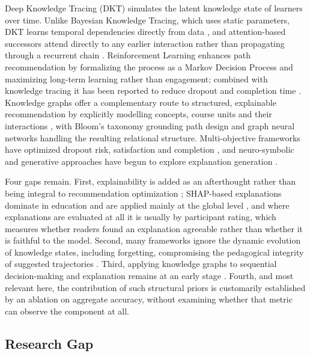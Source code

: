 Deep Knowledge Tracing (DKT) \cite{piech2015dkt} simulates the latent knowledge state of
learners over time. Unlike Bayesian Knowledge Tracing, which uses static parameters, DKT
learns temporal dependencies directly from data \cite{zhang2017dkvmn}, and attention-based
successors \cite{pandey2019sakt, ghosh2020akt} attend directly to any earlier interaction
rather than propagating through a recurrent chain \cite{vaswani2017attention}.
Reinforcement Learning enhances path recommendation by formalizing the process as a Markov
Decision Process and maximizing long-term learning rather than engagement; combined with
knowledge tracing it has been reported to reduce dropout and completion time
\cite{shen2021lpkt, zhao2026rlkt}. Knowledge graphs offer a complementary route to
structured, explainable recommendation by explicitly modelling concepts, course units and
their interactions \cite{kipf2017gcn, zhang2023finegrained}, with Bloom's taxonomy
grounding path design \cite{khosravi2022xaied} and graph neural networks handling the
resulting relational structure. Multi-objective frameworks have optimized dropout risk,
satisfaction and completion \cite{lundberg2017shap}\cite{ribeiro2016lime}, and
neuro-symbolic and generative approaches have begun to explore explanation generation
\cite{zhang2023finegrained, yang2025explainable}.

Four gaps remain. First, explainability is added as an afterthought rather than being
integral to recommendation optimization \cite{xie2025profile}; SHAP-based explanations
dominate in education and are applied mainly at the global level \cite{zhao2026rlkt}, and
where explanations are evaluated at all it is usually by participant rating, which measures
whether readers found an explanation agreeable rather than whether it is faithful to the
model. Second, many frameworks ignore the dynamic evolution of knowledge states, including
forgetting, compromising the pedagogical integrity of suggested trajectories
\cite{boujmiraz2026review}. Third, applying knowledge graphs to sequential decision-making
and explanation remains at an early stage \cite{qiang2026xaiedu}. Fourth, and most relevant
here, the contribution of such structural priors is customarily established by an ablation
on aggregate accuracy, without examining whether that metric can observe the component at
all.

\subsection{Research Gap}

